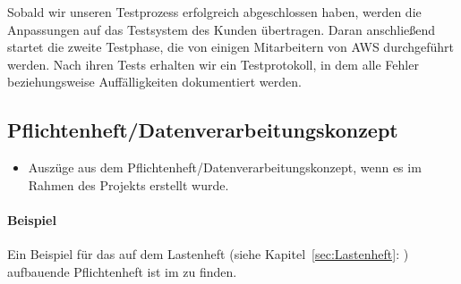 Sobald wir unseren Testprozess erfolgreich abgeschlossen haben, werden die Anpassungen auf das Testsystem des Kunden übertragen.
Daran anschließend startet die zweite Testphase, die von einigen Mitarbeitern von \ac{AWS} durchgeführt werden.
Nach ihren Tests erhalten wir ein Testprotokoll, in dem alle Fehler beziehungsweise Auffälligkeiten dokumentiert werden.

\subsection{Pflichtenheft/Datenverarbeitungskonzept} %
\label{sec:Pflichtenheft}
\begin{itemize}
	\item Auszüge aus dem Pflichtenheft/Datenverarbeitungskonzept, wenn es im Rahmen des Projekts erstellt wurde.
\end{itemize}

\paragraph{Beispiel}
Ein Beispiel für das auf dem Lastenheft (siehe Kapitel~\ref{sec:Lastenheft}: ) aufbauende Pflichtenheft ist im  zu finden.
